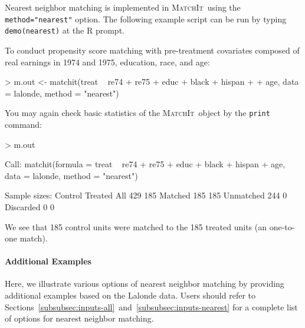 \documentclass[oneside,letterpaper,titlepage]{article}
\newcommand{\MatchIt}{\textsc{MatchIt}}
\begin{document}
Nearest neighbor matching is implemented in \MatchIt\ using the
\texttt{method="nearest"} option.  The following example script can be
run by typing {\tt demo(nearest)} at the R prompt.

To conduct propensity score matching with pre-treatment covariates
composed of real earnings in 1974 and 1975, education, race, and age:
\begin{Schunk}
\begin{Sinput}
> m.out <- matchit(treat ~ re74 + re75 + educ + black + hispan + 
+     age, data = lalonde, method = "nearest")
\end{Sinput}
\end{Schunk}
You may again check basic statistics of the \MatchIt\ object by the
\texttt{print} command:
\begin{Schunk}
\begin{Sinput}
> m.out
\end{Sinput}
\begin{Soutput}
Call: 
matchit(formula = treat ~ re74 + re75 + educ + black + hispan + 
    age, data = lalonde, method = "nearest")

Sample sizes:
          Control Treated
All           429     185
Matched       185     185
Unmatched     244       0
Discarded       0       0
\end{Soutput}
\end{Schunk}
We see that 185 control units were matched to the 185 treated units
(an one-to-one match).  

\paragraph{Additional Examples}
Here, we illustrate various options of nearest neighbor matching by
providing additional examples based on the Lalonde data. Users should
refer to
Sections~\ref{subsubsec:inputs-all}~and~\ref{subsubsec:inputs-nearest}
for a complete list of options for nearest neighbor matching.
\end{document}
